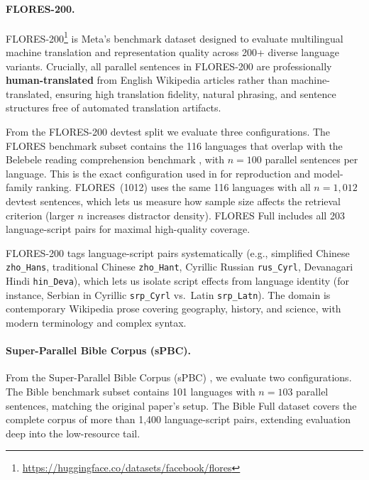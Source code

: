 \paragraph{FLORES-200.}
FLORES-200\footnote{\url{https://huggingface.co/datasets/facebook/flores}} \citep{nllbteam2022} is Meta's benchmark dataset designed to evaluate multilingual machine translation and representation quality across 200+ diverse language variants. Crucially, all parallel sentences in FLORES-200 are professionally \textbf{human-translated} from English Wikipedia articles rather than machine-translated, ensuring high translation fidelity, natural phrasing, and sentence structures free of automated translation artifacts.

From the FLORES-200 devtest split we evaluate three configurations. The FLORES benchmark subset contains the 116 languages that overlap with the Belebele reading comprehension benchmark \citep{bandarkar2024belebele}, with $n = 100$ parallel sentences per language. This is the exact configuration used in \citet{kargaran2025mexa} for reproduction and model-family ranking. FLORES~(1012) uses the same 116 languages with all $n = 1{,}012$ devtest sentences, which lets us measure how sample size affects the retrieval criterion (larger $n$ increases distractor density). FLORES Full includes all 203 language-script pairs for maximal high-quality coverage.

FLORES-200 tags language-script pairs systematically (e.g., simplified Chinese \texttt{zho\_Hans}, traditional Chinese \texttt{zho\_Hant}, Cyrillic Russian \texttt{rus\_Cyrl}, Devanagari Hindi \texttt{hin\_Deva}), which lets us isolate script effects from language identity (for instance, Serbian in Cyrillic \texttt{srp\_Cyrl} vs.\ Latin \texttt{srp\_Latn}). The domain is contemporary Wikipedia prose covering geography, history, and science, with modern terminology and complex syntax.

\paragraph{Super-Parallel Bible Corpus (sPBC).}
From the Super-Parallel Bible Corpus (sPBC) \citep{mayer2014bible, kargaran2025mexa}, we evaluate two configurations. The Bible benchmark subset contains 101 languages with $n = 103$ parallel sentences, matching the original paper's setup. The Bible Full dataset covers the complete corpus of more than 1{,}400 language-script pairs, extending evaluation deep into the low-resource tail.

